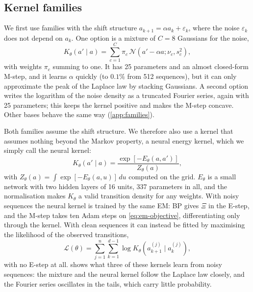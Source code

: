 \documentclass{article}
\begin{document}
\subsection{Kernel families}
\label{sec:kernel-families}

We first use families with the shift structure $a_{k+1}=\alpha a_k+\varepsilon_k$, where the noise $\varepsilon_k$ does
not depend on $a_k$. One option is a mixture of $C=8$ Gaussians for the noise,
\begin{equation}
    K_\theta(a'\mid a)
    =
    \sum_{c=1}^{C}
    \pi_c\,
    \mathcal{N}
    \left(
        a'-\alpha a;\nu_c,s_c^2
    \right),
\end{equation}
with weights $\pi_c$ summing to one. It has 25 parameters and an almost closed-form M-step, and it learns $\alpha$
quickly (to $0.1\%$ from 512 sequences), but it can only approximate the peak of the Laplace law by stacking Gaussians.
A second option writes the logarithm of the noise density as a truncated Fourier series, again with 25 parameters; this
keeps the kernel positive and makes the M-step concave. Other bases behave the same way (\cref{app:families}).

Both families assume the shift structure. We therefore also use a kernel that assumes nothing beyond the Markov
property, a neural energy kernel, which we simply call the neural kernel:
\begin{equation}
    K_\theta(a'\mid a)
    =
    \frac{
        \exp[-E_\theta(a,a')]
    }{
        Z_\theta(a)
    },
    \label{eq:neural-kernel}
\end{equation}
with $Z_\theta(a)=\int\exp[-E_\theta(a,u)]\,du$ computed on the grid. $E_\theta$ is a small network with two hidden
layers of 16 units, 337 parameters in all, and the normalisation makes $K_\theta$ a valid transition density for any
weights. With noisy sequences the neural kernel is trained by the same EM: BP gives $\Xi$ in the E-step, and the M-step
takes ten Adam steps \cite{kingma2015adam} on \cref{eq:em-objective}, differentiating only through the kernel. With clean
sequences it can instead be fitted by maximising the likelihood of the observed transitions,
\begin{equation}
    \mathcal{L}(\theta)
    =
    \sum_{j=1}^{n}
    \sum_{k=1}^{d-1}
    \log K_\theta
    \left(
        a_{k+1}^{(j)}
        \mid a_k^{(j)}
    \right),
    \label{eq:neural-clean-ml}
\end{equation}
with no E-step at all.  shows what three of these kernels learn from noisy sequences: the
mixture and the neural kernel follow the Laplace law closely, and the Fourier series oscillates in the tails, which
carry little probability.
\end{document}
